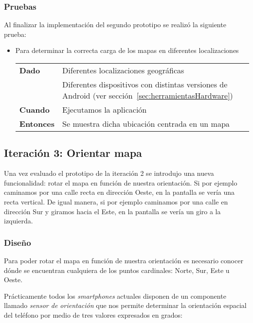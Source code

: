 \subsubsection{Pruebas}

Al finalizar la implementación del segundo prototipo se realizó la siguiente prueba:

\begin{itemize}
  \item Para determinar la correcta carga de los mapas en diferentes localizaciones

  \begin{tabular}{p{}p{}}
    \hline
    \textbf{Dado}     & Diferentes localizaciones geográficas \\
                      & Diferentes dispositivos con distintas versiones de Android (ver
                        sección~\ref{sec:herramientasHardware}) \\
    \textbf{Cuando}   & Ejecutamos la aplicación \\
    \textbf{Entonces} & Se muestra dicha ubicación centrada en un mapa \\
    \hline
  \end{tabular}
\end{itemize}

\subsection{Iteración 3: Orientar mapa}

Una vez evaluado el prototipo de la iteración 2 se introdujo una nueva funcionalidad: rotar el mapa
en función de nuestra orientación. Si por ejemplo caminamos por una calle recta en dirección Oeste,
en la pantalla se vería una recta vertical. De igual manera, si por ejemplo caminamos por una calle
en dirección Sur y giramos hacia el Este, en la pantalla se vería un giro a la izquierda.

\subsubsection{Diseño}

Para poder rotar el mapa en función de nuestra orientación es necesario conocer dónde se encuentran
cualquiera de los puntos cardinales: Norte, Sur, Este u Oeste.

Prácticamente todos los \emph{smartphones} actuales disponen de un componente llamado \emph{sensor
  de orientación} que nos permite determinar la orientación espacial del teléfono por medio de tres
valores expresados en grados:

